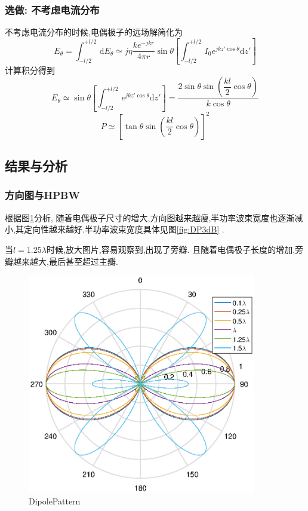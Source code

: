 \subsubsection{选做: 不考虑电流分布}
不考虑电流分布的时候,电偶极子的远场解简化为
\begin{equation}
	E_\theta=\int_{-l/2}^{+l/2}\,\mathrm{d}E_\theta\simeq j\eta\dfrac{ke^{-jkr}}{4\pi r}\sin\theta\left[\int_{-l/2}^{+l/2}\,I_0e^{jkz'\cos\theta}\mathrm{d}z'\right]
\end{equation}
计算积分得到
\begin{equation}
	E_\theta\simeq\sin\theta\left[ \int_{-l/2}^{+l/2}\,e^{jkz'\cos\theta}\mathrm{d}z' \right] =\dfrac{2\sin\theta\sin \left(\dfrac{kl}{2}\cos\theta\right)}{k\cos\theta}
\end{equation}
\begin{equation}
P\simeq \left[\tan\theta\sin\left(\dfrac{kl}{2}\cos\theta\right)\right]^2
\end{equation}
\subsection{结果与分析}
\subsubsection{方向图与HPBW}
根据图\ref{fig:DP}分析, 随着电偶极子尺寸的增大,方向图越来越瘦,半功率波束宽度也逐渐减小,其定向性越来越好.半功率波束宽度具体见图\ref{fig:DP3dB} .

当$l=1.25\lambda$时候,放大图片,容易观察到,出现了旁瓣. 且随着电偶极子长度的增加,旁瓣越来越大,最后甚至超过主瓣.

\begin{figure}[!ht]
\centering
\includegraphics[width=10cm]{DipolePattern.eps}
\caption{DipolePattern} \label{fig:DP}
\end{figure}

